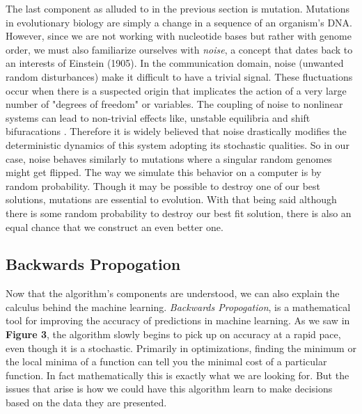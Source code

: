 The last component as alluded to in the previous section is mutation. 
Mutations in evolutionary biology are simply a change in a sequence of an organism's DNA. 
However, since we are not working with nucleotide bases but rather with genome order, we must also familiarize ourselves with \emph{noise}, a concept that dates back to an interests of Einstein (1905). 
In the communication domain, noise (unwanted random disturbances) make it difficult to have a trivial signal. 
These fluctuations occur when there is a suspected origin that implicates the action of a very large number of "degrees of freedom" or variables. 
The coupling of noise to nonlinear systems can lead to non-trivial effects like, unstable equilibria and shift bifuracations \cite{Gammaitoni}. 
Therefore it is widely believed that noise drastically modifies the deterministic dynamics of this system adopting its stochastic qualities. 
So in our case, noise behaves similarly to mutations where a singular random genomes might get flipped. 
The way we simulate this behavior on a computer is by random probability. 
Though it may be possible to destroy one of our best solutions, mutations are essential to evolution. 
With that being said although there is some random probability to destroy our best fit solution, there is also an equal chance that we construct an even better one. 

\subsection{Backwards Propogation}

Now that the algorithm's components are understood, we can also explain the calculus behind the machine learning. 
\emph{Backwards Propogation}, is a mathematical tool for improving the accuracy of predictions in machine learning. 
As we saw in \textbf{Figure 3}, the algorithm slowly begins to pick up on accuracy at a rapid pace, even though it is a stochastic. 
Primarily in optimizations, finding the minimum or the local minima of a function can tell you the minimal cost of a particular function. 
In fact mathematically this is exactly what we are looking for. 
But the issues that arise is how we could have this algorithm learn to make decisions based on the data they are presented. 

